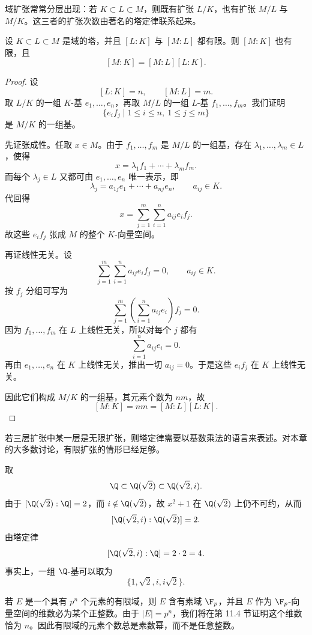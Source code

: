 域扩张常常分层出现：若 $K\subset L\subset M$，则既有扩张 $L/K$，也有扩张 $M/L$ 与 $M/K$。这三者的扩张次数由著名的塔定律联系起来。

\begin{theorem}[塔定律]
设 $K\subset L\subset M$ 是域的塔，并且 $[L:K]$ 与 $[M:L]$ 都有限。则 $[M:K]$ 也有限，且
\[
[M:K]=[M:L][L:K].
\]
\end{theorem}

\begin{proof}
设
\[
[L:K]=n,\qquad [M:L]=m.
\]
取 $L/K$ 的一组 $K$-基 $e_1,\dots,e_n$，再取 $M/L$ 的一组 $L$-基 $f_1,\dots,f_m$。我们证明
\[
\{e_i f_j\mid 1\le i\le n,\ 1\le j\le m\}
\]
是 $M/K$ 的一组基。

先证张成性。任取 $x\in M$。由于 $f_1,\dots,f_m$ 是 $M/L$ 的一组基，存在 $\lambda_1,\dots,\lambda_m\in L$，使得
\[
 x=\lambda_1 f_1+\cdots+\lambda_m f_m.
\]
而每个 $\lambda_j\in L$ 又都可由 $e_1,\dots,e_n$ 唯一表示，即
\[
\lambda_j=a_{1j}e_1+\cdots+a_{nj}e_n,\qquad a_{ij}\in K.
\]
代回得
\[
 x=\sum_{j=1}^m\sum_{i=1}^n a_{ij}e_i f_j.
\]
故这些 $e_i f_j$ 张成 $M$ 的整个 $K$-向量空间。

再证线性无关。设
\[
\sum_{j=1}^m\sum_{i=1}^n a_{ij}e_i f_j=0,\qquad a_{ij}\in K.
\]
按 $f_j$ 分组可写为
\[
\sum_{j=1}^m \left(\sum_{i=1}^n a_{ij}e_i\right)f_j=0.
\]
因为 $f_1,\dots,f_m$ 在 $L$ 上线性无关，所以对每个 $j$ 都有
\[
\sum_{i=1}^n a_{ij}e_i=0.
\]
再由 $e_1,\dots,e_n$ 在 $K$ 上线性无关，推出一切 $a_{ij}=0$。于是这些 $e_i f_j$ 在 $K$ 上线性无关。

因此它们构成 $M/K$ 的一组基，其元素个数为 $nm$，故
\[
[M:K]=nm=[M:L][L:K].
\]
\end{proof}

\begin{remark}
若三层扩张中某一层是无限扩张，则塔定律需要以基数乘法的语言来表述。对本章的大多数讨论，有限扩张的情形已经足够。
\end{remark}

\begin{example}
取
\[
\Q\subset \Q(\sqrt2)\subset \Q(\sqrt2,i).
\]
由于 $[\Q(\sqrt2):\Q]=2$，而 $i\notin \Q(\sqrt2)$，故 $x^2+1$ 在 $\Q(\sqrt2)$ 上仍不可约，从而
\[
[\Q(\sqrt2,i):\Q(\sqrt2)]=2.
\]
由塔定律
\[
[\Q(\sqrt2,i):\Q]=2\cdot 2=4.
\]
事实上，一组 $\Q$-基可以取为
\[
\{1,\sqrt2,i,i\sqrt2\}.
\]
\end{example}

\begin{example}
若 $E$ 是一个具有 $p^n$ 个元素的有限域，则 $E$ 含有素域 $\F_p$，并且 $E$ 作为 $\F_p$-向量空间的维数必为某个正整数。由于 $|E|=p^n$，我们将在第 11.4 节证明这个维数恰为 $n$。因此有限域的元素个数总是素数幂，而不是任意整数。
\end{example}

